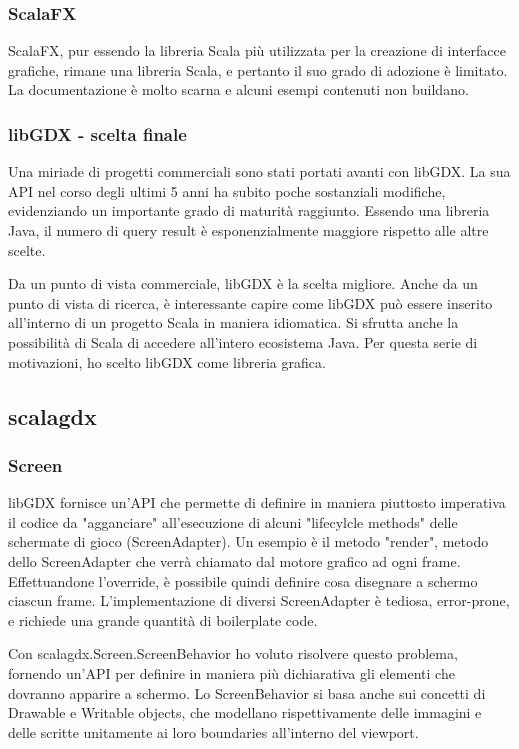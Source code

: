 \subsubsection{ScalaFX}
ScalaFX, pur essendo la libreria Scala più utilizzata per la creazione di interfacce grafiche, rimane una libreria Scala, e pertanto il suo grado di adozione è limitato.
La documentazione è molto scarna e alcuni esempi contenuti non buildano.

\subsubsection{libGDX - scelta finale}
Una miriade di progetti commerciali sono stati portati avanti con libGDX. La sua API nel corso degli ultimi 5 anni ha subito poche sostanziali modifiche, evidenziando un importante grado di maturità raggiunto. Essendo una libreria Java, il numero di query result è esponenzialmente maggiore rispetto alle altre scelte.

Da un punto di vista commerciale, libGDX è la scelta migliore.
Anche da un punto di vista di ricerca, è interessante capire come libGDX può essere inserito all'interno di un progetto Scala in maniera idiomatica. Si sfrutta anche la possibilità di Scala di accedere all'intero ecosistema Java. Per questa serie di motivazioni, ho scelto libGDX come libreria grafica.

\subsection{scalagdx}
\subsubsection{Screen}
libGDX fornisce un'API che permette di definire in maniera piuttosto imperativa il codice da "agganciare" all'esecuzione di alcuni "lifecylcle methods" delle schermate di gioco (ScreenAdapter).
Un esempio è il metodo "render", metodo dello ScreenAdapter che verrà chiamato dal motore grafico ad ogni frame. Effettuandone l'override, è possibile quindi definire cosa disegnare a schermo ciascun frame. L'implementazione di diversi ScreenAdapter è tediosa, error-prone, e richiede una grande quantità di boilerplate code.

Con scalagdx.Screen.ScreenBehavior ho voluto risolvere questo problema, fornendo un'API per definire in maniera più dichiarativa gli elementi che dovranno apparire a schermo. Lo ScreenBehavior si basa anche sui concetti di Drawable e Writable objects, che modellano rispettivamente delle immagini e delle scritte unitamente ai loro boundaries all'interno del viewport.

